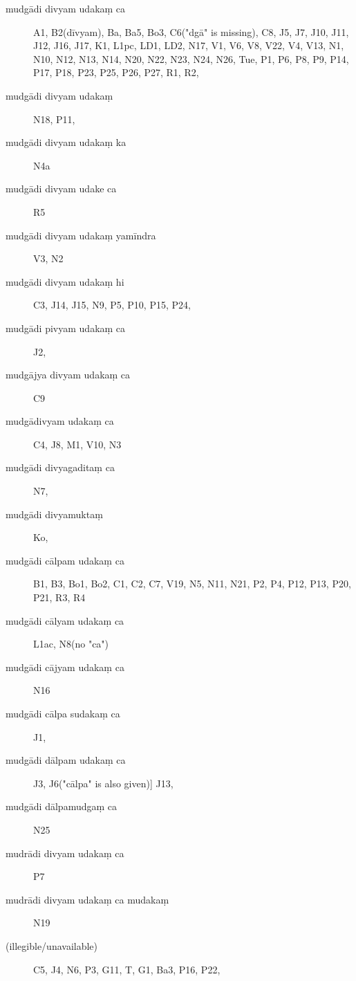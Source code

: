 \begin{ekdosis}
\begin{marma}[hp01_055]
      
\begin{marma}[hp01_062]
  \begin{description}
  \item[mudgādi divyam udakaṃ ca] A1, B2(dīvyam), Ba, Ba5, Bo3, C6("dgā" is missing), C8, J5, J7, J10, J11, J12, J16, J17, K1, L1pc, LD1, LD2, N17, V1, V6, V8, V22, V4, V13, N1, N10, N12, N13, N14, N20, N22, N23, N24, N26, Tue, P1, P6, P8, P9, P14, P17, P18, P23, P25, P26, P27, R1, R2,
\item[mudgādi divyam udakaṃ]   N18, P11,
\item[mudgādi divyam udakaṃ ka]   N4a
\item[mudgādi divyam udake ca]   R5
\item[mudgādi divyam udakaṃ yamīndra]    V3, N2
\item[mudgādi divyam udakaṃ hi]    C3, J14, J15, N9, P5, P10, P15, P24, 
\item[mudgādi pivyam udakaṃ ca]    J2,
\item[mudgājya divyam udakaṃ ca]    C9
\item[mudgādivyam udakaṃ ca]    C4, J8, M1, V10, N3
\item[mudgādi divyagaditaṃ ca]   N7,
\item[mudgādi divyamuktaṃ]    Ko,
\item[mudgādi cālpam udakaṃ ca]    B1, B3, Bo1, Bo2, C1, C2, C7, V19, N5, N11, N21, P2, P4, P12, P13, P20, P21, R3, R4
\item[mudgādi cālyam udakaṃ ca]    L1ac, N8(no "ca")
\item[mudgādi cājyam udakaṃ ca]    N16
\item[mudgādi cālpa sudakaṃ ca]     J1,
\item[mudgādi dālpam udakaṃ ca]    J3, J6("cālpa" is also given)] J13,
\item[mudgādi dālpamudgaṃ ca]    N25
\item[mudrādi divyam udakaṃ ca]  P7
\item[mudrādi divyam udakaṃ ca mudakaṃ]    N19
\item[(illegible/unavailable)]       C5, J4, N6, P3, G11, T, G1, Ba3, P16, P22,
    \end{description}


\end{marma}
\end{marma}
\end{ekdosis}
